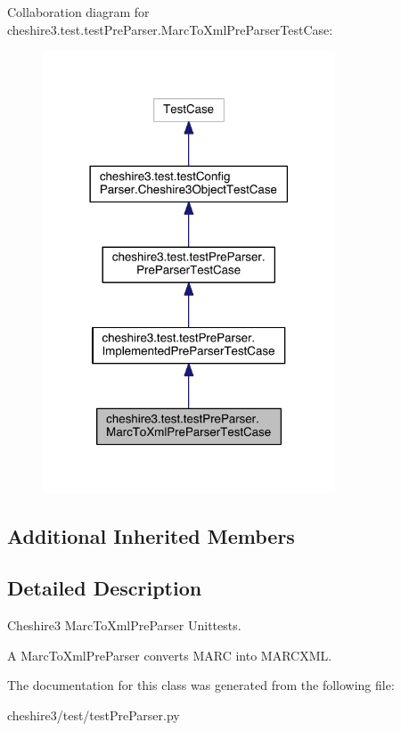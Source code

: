 Collaboration diagram for cheshire3.\-test.\-test\-Pre\-Parser.\-Marc\-To\-Xml\-Pre\-Parser\-Test\-Case\-:
\nopagebreak
\begin{figure}[H]
\begin{center}
\leavevmode
\includegraphics[width=246pt]{classcheshire3_1_1test_1_1test_pre_parser_1_1_marc_to_xml_pre_parser_test_case__coll__graph}
\end{center}
\end{figure}
\subsection*{Additional Inherited Members}


\subsection{Detailed Description}
\begin{DoxyVerb}Cheshire3 MarcToXmlPreParser Unittests.

A MarcToXmlPreParser converts MARC into MARCXML.
\end{DoxyVerb}
 

The documentation for this class was generated from the following file\-:\begin{DoxyCompactItemize}
\item 
cheshire3/test/test\-Pre\-Parser.\-py\end{DoxyCompactItemize}
